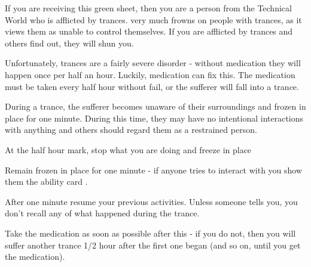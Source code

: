 \documentclass[green]{guildcamp3}
\begin{document}
	
	\name{\gTrance{}}
		
	If you are receiving this green sheet, then you are a person from the Technical World who is afflicted by trances. \bTechWorld{} very much frowns on people with trances, as it views them as unable to control themselves. If you are afflicted by trances and others find out, they will shun you. 
	
	Unfortunately, trances are a fairly severe disorder - without medication they will happen once per half an hour. Luckily, medication can fix this. The medication must be taken every half hour without fail, or the sufferer will fall into a trance. 
	
	During a trance, the sufferer becomes unaware of their surroundings and frozen in place for one minute. During this time, they may have no intentional interactions with anything and others should regard them as a restrained person. 
	
	
	\begin{enum}[Directions]
		\item At the half hour mark, stop what you are doing and freeze in place
		\item Remain frozen in place for one minute - if anyone tries to interact with you show them the ability card \aTrance{}. 
		\item After one minute resume your previous activities. Unless someone tells you, you don't recall any of what happened during the trance.
		\item Take the medication as soon as possible after this - if you do not, then you will suffer another trance 1/2 hour after the first one began (and so on, until you get the medication).
	\end{enum}
	
	
\end{document}
